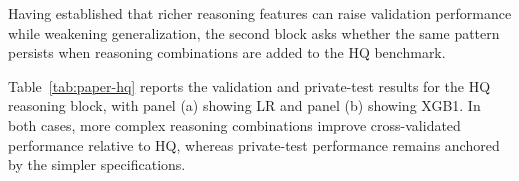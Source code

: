 \documentclass{article}
\theoremstyle{plain}
\theoremstyle{definition}
\theoremstyle{remark}
\begin{document}
\begin{table}[t]
\centering
\small
{}
\caption{Part 1 per-model validation vs private-test.}
\label{tab:paper-models}
\end{table}

Having established that richer reasoning features can raise validation performance while weakening generalization, the second block asks whether the same pattern persists when reasoning combinations are added to the HQ benchmark.

Table~\ref{tab:paper-hq} reports the validation and private-test results for the HQ reasoning block, with panel (a) showing LR and panel (b) showing XGB1. In both cases, more complex reasoning combinations improve cross-validated performance relative to HQ, whereas private-test performance remains anchored by the simpler specifications.
\end{document}
